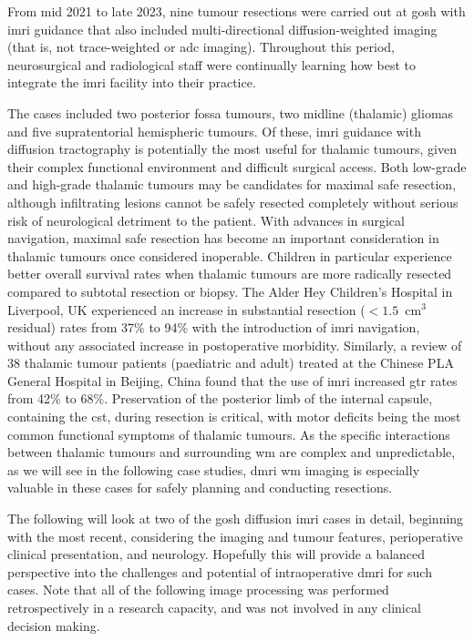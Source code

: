 \documentclass[12pt,phd,a4paper,twoside]{ucl_thesis}
\begin{document}
From mid 2021 to late 2023, nine tumour resections were carried out at \gls{gosh} with \gls{imri} guidance that also included multi-directional diffusion-weighted imaging (that is, not trace-weighted or \gls{adc} imaging).
Throughout this period, neurosurgical and radiological staff were continually learning how best to integrate the \gls{imri} facility into their practice.

The cases included two posterior fossa tumours, two midline (thalamic) gliomas and five supratentorial hemispheric tumours.
Of these, \gls{imri} guidance with diffusion tractography is potentially the most useful for thalamic tumours, given their complex functional environment and difficult surgical access.
Both low-grade \autocite{Wong2016} and high-grade\autocite{Dorfer2021} thalamic tumours may be candidates for maximal safe resection, although infiltrating lesions cannot be safely resected completely without serious risk of neurological detriment to the patient.
With advances in surgical navigation, maximal safe resection has become an important consideration in thalamic tumours once considered inoperable\autocite{Souweidane1996,Puget2007,Steinbok2016,Grewal2019,Sunderland2021}.
Children in particular\autocite{Ferroli2023} experience better overall survival rates when thalamic tumours are more radically resected compared to subtotal resection or biopsy\autocite{Cinalli2018}.
The Alder Hey Children's Hospital in Liverpool, UK experienced an increase in substantial resection ($<1.5$~cm$^3$ residual) rates from 37\% to 94\% with the introduction of \gls{imri} navigation, without any associated increase in postoperative morbidity\autocite{Sunderland2021}.
Similarly, a review of 38 thalamic tumour patients (paediatric and adult) treated at the Chinese PLA General Hospital in Beijing, China found that the use of \gls{imri} increased \gls{gtr} rates from 42\% to 68\%\autocite{Zheng2016}.
Preservation of the posterior limb of the internal capsule, containing the \gls{cst}, during resection is critical, with motor deficits being the most common functional symptoms of thalamic tumours\autocite{Puget2007, Zheng2016, Palmisciano2021}.
As the specific interactions between thalamic tumours and surrounding \gls{wm} are complex and unpredictable, as we will see in the following case studies, \gls{dmri} \gls{wm} imaging is especially valuable in these cases for safely planning and conducting resections\autocite{Celtikci2017}.

The following will look at two of the \gls{gosh} diffusion \gls{imri} cases in detail, beginning with the most recent, considering the imaging and tumour features, perioperative clinical presentation, and neurology.
Hopefully this will provide a balanced perspective into the challenges and potential of intraoperative \gls{dmri} for such cases.
Note that all of the following image processing was performed retrospectively in a research capacity, and was not involved in any clinical decision making.
\end{document}
